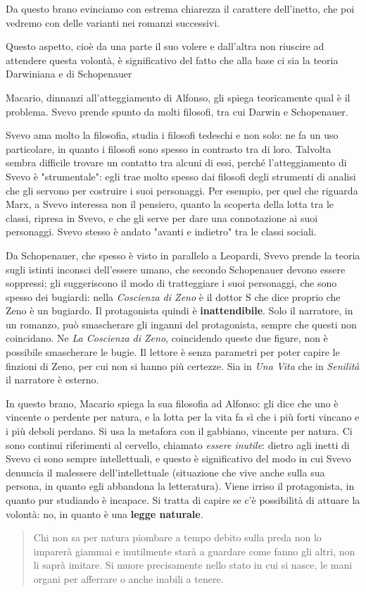 \documentclass[a4paper, twoside, titlepage]{book}
\newcommand{\citazione}[1]{%
  \begin{quotation}
  \noindent #1
  \end{quotation}}
\begin{document}
Da questo brano evinciamo con estrema chiarezza il carattere dell'inetto, che poi vedremo con delle varianti nei romanzi successivi.

Questo aspetto, cioè da una parte il suo volere e dall'altra non riuscire ad attendere questa volontà, è significativo del fatto che alla base ci sia la teoria Darwiniana e di Schopenauer

Macario, dinnanzi all'atteggiamento di Alfonso, gli spiega teoricamente qual è il problema. Svevo prende spunto da molti filosofi, tra cui Darwin e Schopenauer.

Svevo ama molto la filosofia, studia i filosofi tedeschi e non solo: ne fa un uso particolare, in quanto i filosofi sono spesso in contrasto tra di loro. Talvolta sembra difficile trovare un contatto tra alcuni di essi, perché l'atteggiamento di Svevo è "strumentale": egli trae molto spesso dai filosofi degli strumenti di analisi che gli servono per costruire i suoi personaggi.
Per esempio, per quel che riguarda Marx, a Svevo interessa non il pensiero, quanto la scoperta della lotta tra le classi, ripresa in Svevo, e che gli serve per dare una connotazione ai suoi personaggi.
Svevo stesso è andato "avanti e indietro" tra le classi sociali.

Da Schopenauer, che spesso è visto in parallelo a Leopardi, Svevo prende la teoria sugli istinti inconsci dell'essere umano, che secondo Schopenauer devono essere soppressi; gli suggeriscono il modo di tratteggiare i suoi personaggi, che sono spesso dei bugiardi: nella \textit{Coscienza di Zeno} è il dottor S che dice proprio che Zeno è un bugiardo. Il protagonista quindi è \textbf{inattendibile}. Solo il narratore, in un romanzo, può smascherare gli inganni del protagonista, sempre che questi non coincidano. Ne \textit{La Coscienza di Zeno}, coincidendo queste due figure, non è possibile smascherare le bugie. Il lettore è senza parametri per poter capire le finzioni di Zeno, per cui non si hanno più certezze. Sia in \textit{Una Vita} che in \textit{Senilità} il narratore è esterno.

In questo brano, Macario spiega la sua filosofia ad Alfonso: gli dice che uno è vincente o perdente per natura, e la lotta per la vita fa sì che i più forti vincano e i più deboli perdano. Si usa la metafora con il gabbiano, vincente per natura. Ci sono continui riferimenti al cervello, chiamato \textit{essere inutile}: dietro agli inetti di Svevo ci sono sempre intellettuali, e questo è significativo del modo in cui Svevo denuncia il malessere dell'intellettuale (situazione che vive anche sulla sua persona, in quanto egli abbandona la letteratura). Viene irriso il protagonista, in quanto pur studiando è incapace.
Si tratta di capire se c'è possibilità di attuare la volontà: no, in quanto è una \textbf{legge naturale}.
\citazione{Chi non sa per natura piombare a tempo debito sulla preda non lo imparerà giammai e inutilmente starà a guardare come fanno gli altri, non li saprà imitare. Si muore precisamente nello stato in cui si nasce, le mani organi per afferrare o anche inabili a tenere.}
\end{document}
